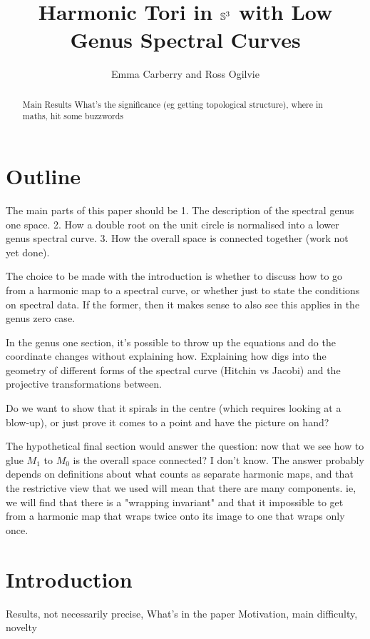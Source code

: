 \documentclass{article}
\begin{document}
\title{Harmonic Tori in $\S^3$ with Low Genus Spectral Curves}
\author{Emma Carberry and Ross Ogilvie}
\date{}
\maketitle

\begin{abstract}
Main Results
What's the significance (eg getting topological structure), where in maths, hit some buzzwords
\end{abstract}

\section{Outline}
The main parts of this paper should be 1. The description of the spectral genus one space. 2. How a double root on the unit circle is normalised into a lower genus spectral curve. 3. How the overall space is connected together (work not yet done).

The choice to be made with the introduction is whether to discuss how to go from a harmonic map to a spectral curve, or whether just to state the conditions on spectral data. If the former, then it makes sense to also see this applies in the genus zero case.

In the genus one section, it's possible to throw up the equations and do the coordinate changes without explaining how. Explaining how digs into the geometry of different forms of the spectral curve (Hitchin vs Jacobi) and the projective transformations between.


Do we want to show that it spirals in the centre (which requires looking at a blow-up), or just prove it comes to a point and have the picture on hand?

The hypothetical final section would answer the question: now that we see how to glue $M_1$ to $M_0$ is the overall space connected? I don't know. The answer probably depends on definitions about what counts as separate harmonic maps, and that the restrictive view that we used will mean that there are many components. ie, we will find that there is a "wrapping invariant" and that it impossible to get from a harmonic map that wraps twice onto its image to one that wraps only once.

\section{Introduction}
\label{sec:Introduction}
Results, not necessarily precise, What's in the paper
Motivation, main difficulty, novelty
\end{document}
